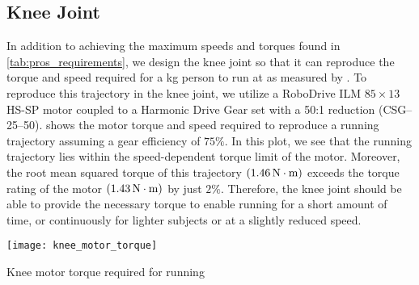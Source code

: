 \subsection{Knee Joint}
\begin{comment}
\begin{marginfigure}[0in]
    \centering \texttt{[image: knee\_running\_torque]}
    \caption{Knee torque required for running}\label{fig:knee_running_torque}
\end{marginfigure}
\begin{marginfigure}[0in]
    \centering \texttt{[image: knee\_running\_speed]}
    \caption{Knee torque required for running}\label{fig:knee_running_speed}
\end{marginfigure}
\end{comment}

In addition to achieving the maximum speeds and torques found in
\cref{tab:pros_requirements}, we design the knee joint so that it can reproduce
the torque and speed required for a \unit[80]{kg} person to run at
 as measured by \citet{novacheck1998biomechanics}. To
reproduce this trajectory in the knee joint, we utilize a RoboDrive ILM
$85\times13$ HS-SP motor coupled to a Harmonic Drive Gear set with a 50:1
reduction (CSG--25--50).  shows the motor torque
and speed required to reproduce a running trajectory assuming a gear
efficiency of $75\%$. In this plot, we see that the running trajectory lies
within the speed-dependent torque limit of the motor. Moreover, the root mean
squared torque of this trajectory $(\unit[1.46]{N \cdot m})$ exceeds the torque
rating of the motor $(\unit[1.43]{N \cdot m})$ by just $2\%$. Therefore, the
knee joint should be able to provide the necessary torque to enable running for
a short amount of time, or continuously for lighter subjects or at a slightly
reduced speed.
\begin{marginfigure}[-2in]
    \centering 
    \texttt{[image: knee\_motor\_torque]}
    \caption{Knee motor torque required for
    running}\label{fig:knee_motor_torque}
\end{marginfigure}

